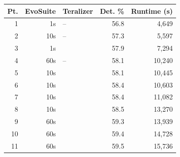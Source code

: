   \begin{tabular}{rrlrr}
  \toprule
  Pt. & EvoSuite & Teralizer & Det. \% & Runtime (s) \\
  \midrule
  1 & 1s & -- & 56.8 & 4,649 \\
  2 & 10s & -- & 57.3 & 5,597 \\
  3 & 1s & \VariantImprovedA{} & 57.9 & 7,294 \\
  4 & 60s & -- & 58.1 & 10,240 \\
  5 & 10s & \VariantNaiveA{} & 58.1 & 10,445 \\
  6 & 10s & \VariantImprovedB{} & 58.4 & 10,603 \\
  7 & 10s & \VariantImprovedA{} & 58.4 & 11,082 \\
  8 & 10s & \VariantImprovedC{} & 58.5 & 13,270 \\
  9 & 60s & \VariantImprovedA{} & 59.3 & 13,939 \\
  10 & 60s & \VariantImprovedB{} & 59.4 & 14,728 \\
  11 & 60s & \VariantImprovedC{} & 59.5 & 15,736 \\
  \bottomrule
  \end{tabular}

